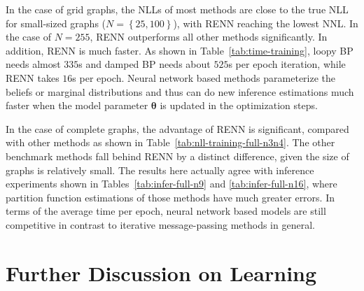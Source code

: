 In the case of grid graphs, the NLLs of most methods are close to the true NLL for small-sized graphs ($N=\left\{ 25, 100 \right\}$), with RENN reaching the lowest NNL. In the case of $N=255$, RENN outperforms all other methods significantly. In addition, RENN is much faster. As shown in Table~\ref{tab:time-training}, loopy BP needs almost $335$s and damped BP needs about $525$s per epoch iteration, while RENN takes $16$s per epoch.
Neural network based methods parameterize the beliefs or marginal distributions and thus can do new inference estimations much faster when the model parameter $\bm{\theta}$ is updated in the optimization steps. 



In the case of complete graphs, the advantage of RENN is significant, compared with other methods as shown in Table~\ref{tab:nll-training-full-n3n4}. The other benchmark methods fall behind RENN by a distinct difference, given the size of graphs is relatively small. The results here actually agree with inference experiments shown in Tables~\ref{tab:infer-full-n9} and \ref{tab:infer-full-n16}, where partition function estimations of those methods have much greater errors. In terms of the average time per epoch, neural network based models are still competitive in contrast to iterative message-passing methods in general.


\section{Further Discussion on Learning}\label{chpt5:sec:futher-dis-learning}

